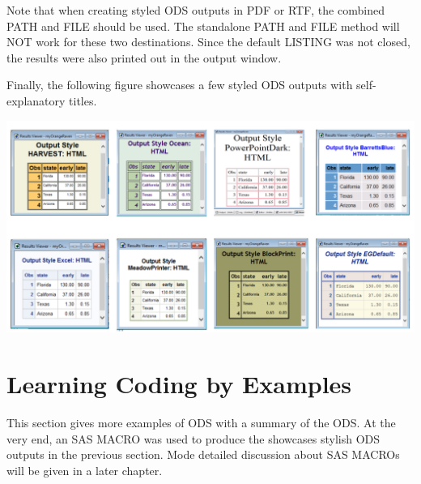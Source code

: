 \documentclass[
]{book}
\begin{document}
Note that when creating styled ODS outputs in PDF or RTF, the combined PATH and FILE should be used. The standalone PATH and FILE method will NOT work for these two destinations. Since the default LISTING was not closed, the results were also printed out in the output window.

Finally, the following figure showcases a few styled ODS outputs with self-explanatory titles.

\begin{center}\includegraphics[width=1\linewidth]{img12/w12-styles-showcase} \end{center}

\hypertarget{learning-coding-by-examples-8}{%
\section{Learning Coding by Examples}\label{learning-coding-by-examples-8}}

This section gives more examples of ODS with a summary of the ODS. At the very end, an SAS MACRO was used to produce the showcases stylish ODS outputs in the previous section. Mode detailed discussion about SAS MACROs will be given in a later chapter.
\end{document}
